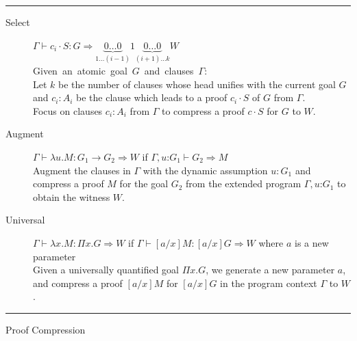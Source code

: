 \documentclass{acmconf}
\newcommand{\figfoot}{\vspace{1ex}\hrule}
\newcommand{\fighead}{\hrule\vspace{1.5ex}}
\newcommand{\vd}{\vdash}
\newcommand{\arrow}{\rightarrow}
\newcommand{\oftp}{\mathord{:}}
\begin{document}
\begin{table}[h]
\fighead
\begin{center}
\begin{small}
\begin{description}
\item[Select] $\Gamma \vd c_i \cdot S: G \Rightarrow
  \underset{1 \ldots (i-1)}{\underbrace{0\ldots 0}}1\underset{(i+1) \ldots k}{\underbrace{0\ldots 0}}W $ \\
    \mbox{Given an atomic goal $G$ and clauses $\Gamma$:}\hfill\\
    Let $k$ be the number of clauses whose head unifies with the
    current goal $G$ and $c_i : A_i$ be the clause which leads to a
    proof $c_i\cdot S$ of $G$ from $\Gamma$.\\
    Focus on clauses $c_i : A_i$ from $\Gamma$ to compress a proof
     $c\cdot S$ for $G$ to $W$.

\item[Augment] $\Gamma \vd   \lambda u. M : G_1 \arrow G_2 \Rightarrow
  W$ if $\Gamma,
  u\oftp G_1 \vd G_2 \Rightarrow M$ \\
Augment the clauses in $\Gamma$ with the dynamic assumption $u : G_1$ and
compress a proof $M$ for the goal $G_2$ from the extended program
$\Gamma, u \oftp G_1$ to obtain the witness $W$. 
\item[Universal] $\Gamma \vd  \lambda x. M : \Pi x. G \Rightarrow W$ if $\Gamma \vd
  [a/x]M: [a/x]G\Rightarrow W$ where $a$ is a new parameter\\
Given a universally quantified goal $\Pi x. G$, we generate a new
parameter $a$, and compress a proof $[a/x]M$  for $[a/x]G$ in the
program context $\Gamma$ to $W$.
\end{description}
\end{small}    
\end{center}
\figfoot
\caption{\label{fig:pwgen}Proof Compression}
\end{table}


\end{document}
